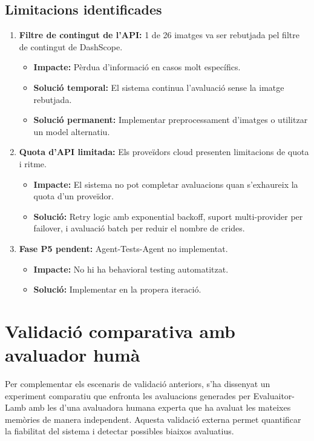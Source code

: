 \documentclass[12pt,a4paper,twoside]{report}
\begin{document}
\subsection{Limitacions identificades}

\begin{enumerate}
    \item \textbf{Filtre de contingut de l'API:} 1 de 26 imatges va ser rebutjada pel filtre de contingut de DashScope.
    \begin{itemize}
        \item \textbf{Impacte:} P\`erdua d'informaci\'o en casos molt espec\'ifics.
        \item \textbf{Soluci\'o temporal:} El sistema continua l'avaluaci\'o sense la imatge rebutjada.
        \item \textbf{Soluci\'o permanent:} Implementar preprocessament d'imatges o utilitzar un model alternatiu.
    \end{itemize}
    \item \textbf{Quota d'API limitada:} Els prove\"idors cloud presenten limitacions de quota i ritme.
    \begin{itemize}
        \item \textbf{Impacte:} El sistema no pot completar avaluacions quan s'exhaureix la quota d'un prove\"idor.
        \item \textbf{Soluci\'o:} Retry logic amb exponential backoff, suport multi-provider per failover, i avaluaci\'o batch per reduir el nombre de crides.
    \end{itemize}
    \item \textbf{Fase P5 pendent:} Agent-Tests-Agent no implementat.
    \begin{itemize}
        \item \textbf{Impacte:} No hi ha behavioral testing automatitzat.
        \item \textbf{Soluci\'o:} Implementar en la propera iteraci\'o.
    \end{itemize}
\end{enumerate}

\section{Validaci\'o comparativa amb avaluador hum\`a}
\label{sec:validacio-humana}

Per complementar els escenaris de validaci\'o anteriors, s'ha dissenyat un experiment comparatiu que enfronta les avaluacions generades per Evaluaitor-Lamb amb les d'una avaluadora humana experta que ha avaluat les mateixes mem\`ories de manera independent. Aquesta validaci\'o externa permet quantificar la fiabilitat del sistema i detectar possibles biaixos avaluatius.
\end{document}

